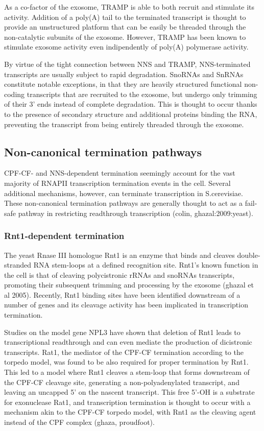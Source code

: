 As a co-factor of the exosome, TRAMP is able to both recruit and stimulate its activity. 
Addition of a poly(A) tail to the terminated transcript is thought to provide an unstructured platform that can be easily be threaded through the non-catalytic subunits of the exosome. 
However, TRAMP has been known to stimulate exosome activity even indipendently of poly(A) polymerase activity. 

By virtue of the tight connection between NNS and TRAMP, NNS-terminated transcripts are usually subject to rapid degradation. SnoRNAs and SnRNAs constitute notable exceptions, in that they are heavily structured functional non-coding transcripts that are recruited to the exosome, but undergo only trimming of their 3’ ends instead of complete degradation. This is thought to occur thanks to the presence of secondary structure and additional proteins binding the RNA, preventing the transcript from being entirely threaded through the exosome.


\subsection{Non-canonical termination pathways}

CPF-CF- and NNS-dependent termination seemingly account for the vast majority of RNAPII transcription termination events in the cell.
Several additional mechanisms, however, can terminate transcription in S.cerevisiae. 
These non-canonical termination pathways are generally thought to act as a fail-safe pathway in restricting readthrough transcription (colin, ghazal:2009:yeast).


\subsubsection{Rnt1-dependent termination}

The yeast Rnase III homologue Rnt1 is an enzyme that binds and cleaves double-stranded RNA stem-loops at a defined recognition site. 
Rnt1’s known function in the cell is that of cleaving polycistronic rRNAs and snoRNAs transcripts, promoting their subsequent trimming and processing by the exosome (ghazal et al 2005). 
Recently, Rnt1 binding sites have been identified downstream of a number of genes and its cleavage activity has been implicated in transcription termination.

Studies on the model gene NPL3 have shown that deletion of Rnt1 leads to transcriptional readthrough and can even mediate the production of dicistronic transcripts. 
Rat1, the mediator of the CPF-CF termination according to the torpedo model, was found to be also required for proper termination by Rnt1. 
This led to a model where Rnt1 cleaves a stem-loop that forms downstream of the CPF-CF cleavage site, generating a non-polyadenylated transcript, and leaving an uncapped 5’ on the nascent transcript. 
This free 5’-OH is a substrate for exonuclease Rat1, and transcription termination is thought to occur with a mechanism akin to the CPF-CF torpedo model, with Rnt1 as the cleaving agent instead of the CPF complex (ghaza, proudfoot).

